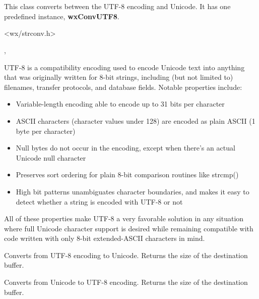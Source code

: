 %
%


\section{}\label{wxmbconvutf8}

This class converts between the UTF-8 encoding and Unicode.
It has one predefined instance, {\bf wxConvUTF8}.




<wx/strconv.h>


, 


UTF-8 is a compatibility encoding used to encode Unicode text into anything that was
originally written for 8-bit strings, including (but not limited to) filenames, transfer
protocols, and database fields. Notable properties include:

\begin{itemize}
\item Variable-length encoding able to encode up to 31 bits per character
\item ASCII characters (character values under 128) are encoded as plain ASCII
(1 byte per character)
\item Null bytes do not occur in the encoding, except when there's an actual Unicode
null character
\item Preserves sort ordering for plain 8-bit comparison routines like strcmp()
\item High bit patterns unambiguates character boundaries, and makes it easy to
detect whether a string is encoded with UTF-8 or not
\end{itemize}

All of these properties make UTF-8 a very favorable solution in any situation
where full Unicode character support is desired while remaining compatible with
code written with only 8-bit extended-ASCII characters in mind.



\label{wxmbconvutf8mb2wc}


Converts from UTF-8 encoding to Unicode. Returns the size of the destination buffer.

\label{wxmbconvutf8wc2mb}


Converts from Unicode to UTF-8 encoding. Returns the size of the destination buffer.
